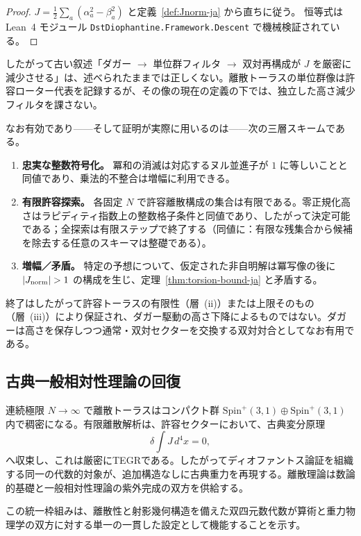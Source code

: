 \documentclass[dvipdfmx,a4paper]{article}
\theoremstyle{definition}
\theoremstyle{remark}
\newcommand{\Jnorm}{J_{\rm norm}}
\begin{document}
\begin{proof}
$J=\frac12\sum_a(\alpha_a^2-\beta_a^2)$ と定義~\ref{def:Jnorm-ja} から直ちに従う。
恒等式は Lean~4 モジュール
\texttt{DstDiophantine.Framework.Descent}
で機械検証されている。
\end{proof}

したがって古い叙述「ダガー $\to$ 単位群フィルタ $\to$ 双対再構成が $J$ を厳密に減少させる」は、述べられたままでは正しくない。離散トーラスの単位群像は許容ローター代表を記録するが、その像の現在の定義の下では、独立した高さ減少フィルタを課さない。

なお有効であり——そして証明が実際に用いるのは——次の三層スキームである。

\begin{enumerate}[label=(\roman*)]
  \item \textbf{忠実な整数符号化。} 冪和の消滅は対応するヌル並進子が $1$ に等しいことと同値であり、乗法的不整合は増幅に利用できる。
  \item \textbf{有限許容探索。} 各固定 $N$ で許容離散構成の集合は有限である。零正規化高さはラピディティ指数上の整数格子条件と同値であり、したがって決定可能である；全探索は有限ステップで終了する（同値に：有限な残集合から候補を除去する任意のスキーマは整礎である）。
  \item \textbf{増幅／矛盾。} 特定の予想について、仮定された非自明解は冪写像の後に $|\Jnorm|>1$ の構成を生じ、定理~\ref{thm:torsion-bound-ja} と矛盾する。
\end{enumerate}

終了はしたがって許容トーラスの有限性（層~(ii)）または上限そのもの（層~(iii)）により保証され、ダガー駆動の高さ下降によるものではない。ダガーは高さを保存しつつ通常・双対セクターを交換する双対対合としてなお有用である。

\subsection{古典一般相対性理論の回復}

連続極限 $N \to \infty$ で離散トーラスはコンパクト群 $\mathrm{Spin}^+(3,1) \oplus \mathrm{Spin}^+(3,1)$ 内で稠密になる。有限離散解析は、許容セクターにおいて、古典変分原理
\[
\delta \int J \, d^4x = 0,
\]
へ収束し、これは厳密にTEGRである。したがってディオファントス論証を組織する同一の代数的対象が、追加構造なしに古典重力を再現する。離散理論は数論的基礎と一般相対性理論の紫外完成の双方を供給する。

この統一枠組みは、離散性と射影幾何構造を備えた双四元数代数が算術と重力物理学の双方に対する単一の一貫した設定として機能することを示す。
\end{document}
